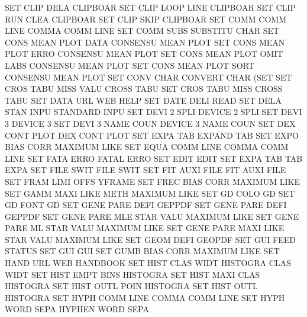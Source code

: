 SET      CLIP DELA                      CLIPBOAR
SET      CLIP LOOP LINE                 CLIPBOAR
SET      CLIP RUN  CLEA                 CLIPBOAR
SET      CLIP SKIP                      CLIPBOAR
SET      COMM COMM LINE                 COMMA    COMM LINE
SET      COMM SUBS                      SUBSTITU CHAR
SET      CONS MEAN PLOT DATA            CONSENSU MEAN PLOT
SET      CONS MEAN PLOT ERRO            CONSENSU MEAN PLOT
SET      CONS MEAN PLOT OMIT LABS       CONSENSU MEAN PLOT
SET      CONS MEAN PLOT SORT            CONSENSU MEAN PLOT
SET      CONV CHAR                      CONVERT  CHAR (SET
SET      CROS TABU MISS VALU            CROSS    TABU
SET      CROS TABU MISS                 CROSS    TABU
SET      DATA URL                       WEB      HELP
SET      DATE DELI                      READ
SET      DELA STAN INPU                 STANDARD INPU
SET      DEVI 2    SPLI                 DEVICE   2    SPLI 
SET      DEVI 3                         DEVICE   3
SET      DEVI 3    NAME COUN            DEVICE   3    NAME COUN
SET      DEX  CONT PLOT                 DEX      CONT PLOT
SET      EXPA TAB                       EXPAND   TAB
SET      EXPO BIAS CORR                 MAXIMUM  LIKE
SET      EQUA COMM LINE                 COMMA    COMM LINE
SET      FATA ERRO                      FATAL    ERRO
SET      EDIT                           EDIT
SET      EXPA TAB                       TAB      EXPA
SET      FILE SWIT                      FILE     SWIT
SET      FIT  AUXI FILE                 FIT      AUXI FILE
SET      FRAM LIMI OFFS                 YFRAME
SET      FREC BIAS CORR                 MAXIMUM  LIKE
SET      GAMM MAXI LIKE METH            MAXIMUM  LIKE
SET      GD   COLO                      GD
SET      GD   FONT                      GD
SET      GENE PARE DEFI                 GEPPDF
SET      GENE PARE DEFI                 GEPPDF
SET      GENE PARE MLE  STAR VALU       MAXIMUM  LIKE
SET      GENE PARE ML   STAR VALU       MAXIMUM  LIKE
SET      GENE PARE MAXI LIKE STAR VALU  MAXIMUM  LIKE
SET      GEOM DEFI                      GEOPDF
SET      GUI  FEED                      STATUS
SET      GUI                            GUI
SET      GUMB BIAS CORR                 MAXIMUM  LIKE
SET      HAND URL                       WEB      HANDBOOK
SET      HIST CLAS WIDT                 HISTOGRA CLAS WIDT
SET      HIST EMPT BINS                 HISTOGRA
SET      HIST MAXI CLAS                 HISTOGRA
SET      HIST OUTL POIN                 HISTOGRA
SET      HIST OUTL                      HISTOGRA
SET      HYPH COMM LINE                 COMMA    COMM LINE
SET      HYPH WORD SEPA                 HYPHEN   WORD SEPA
